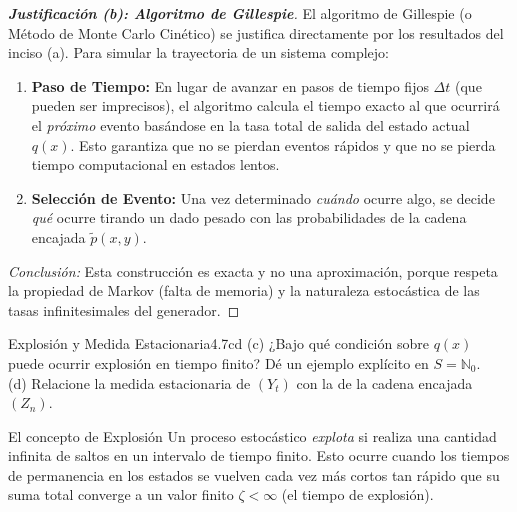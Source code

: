 \documentclass[10pt,a4paper]{article}
\begin{document}
\begin{proof}[\textbf{Justificación (b): Algoritmo de Gillespie}]
    El algoritmo de Gillespie (o Método de Monte Carlo Cinético) se justifica directamente por los resultados del inciso (a). Para simular la trayectoria de un sistema complejo:
    
    \begin{enumerate}
        \item \textbf{Paso de Tiempo:} En lugar de avanzar en pasos de tiempo fijos $\Delta t$ (que pueden ser imprecisos), el algoritmo calcula el tiempo exacto al que ocurrirá el \textit{próximo} evento basándose en la tasa total de salida del estado actual $q(x)$. Esto garantiza que no se pierdan eventos rápidos y que no se pierda tiempo computacional en estados lentos.
        \item \textbf{Selección de Evento:} Una vez determinado \textit{cuándo} ocurre algo, se decide \textit{qué} ocurre tirando un dado pesado con las probabilidades de la cadena encajada $\tilde{p}(x,y)$.
    \end{enumerate}
    
    \textit{Conclusión:} Esta construcción es exacta y no una aproximación, porque respeta la propiedad de Markov (falta de memoria) y la naturaleza estocástica de las tasas infinitesimales del generador.
\end{proof}
\newpage

\begin{ejercicio}{Explosión y Medida Estacionaria}{4.7cd}
    (c) ¿Bajo qué condición sobre $q(x)$ puede ocurrir explosión en tiempo finito? Dé un ejemplo explícito en $S = \mathbb{N}_0$. \\
    (d) Relacione la medida estacionaria de $(Y_t)$ con la de la cadena encajada $(Z_n)$.
\end{ejercicio}

\vspace{2mm}

\begin{nota}{El concepto de Explosión}
    Un proceso estocástico \textit{explota} si realiza una cantidad infinita de saltos en un intervalo de tiempo finito. Esto ocurre cuando los tiempos de permanencia en los estados se vuelven cada vez más cortos tan rápido que su suma total converge a un valor finito $\zeta < \infty$ (el tiempo de explosión).
\end{nota}

\vspace{5mm}
\end{document}
